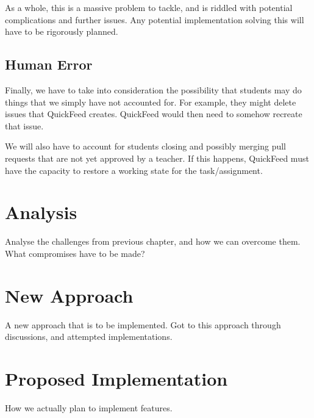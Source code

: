 As a whole, this is a massive problem to tackle, and is riddled with potential complications and further issues.
Any potential implementation solving this will have to be rigorously planned. 

\subsection{Human Error}

Finally, we have to take into consideration the possibility that students may do things that we simply have not accounted for.
For example, they might delete issues that QuickFeed creates.
QuickFeed would then need to somehow recreate that issue.

We will also have to account for students closing and possibly merging pull requests that are not yet approved by a teacher.
If this happens, QuickFeed must have the capacity to restore a working state for the task/assignment.

\section{Analysis}

Analyse the challenges from previous chapter, and how we can overcome them.
What compromises have to be made?

\section{New Approach}

A new approach that is to be implemented. Got to this approach through discussions, and attempted implementations.

\section{Proposed Implementation}

How we actually plan to implement features.